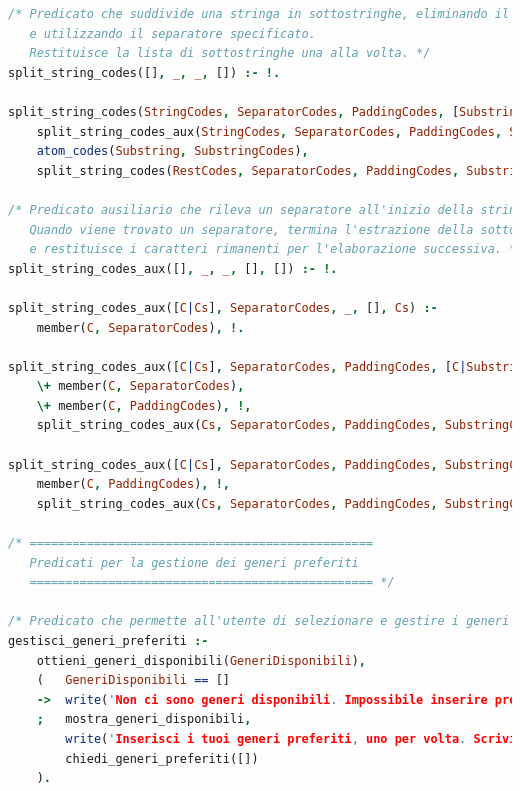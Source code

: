 \documentclass[a4paper,11pt]{article}
\begin{document}
\begin{lstlisting}[language=Prolog]
/* Predicato che suddivide una stringa in sottostringhe, eliminando il padding
   e utilizzando il separatore specificato.
   Restituisce la lista di sottostringhe una alla volta. */
split_string_codes([], _, _, []) :- !.

split_string_codes(StringCodes, SeparatorCodes, PaddingCodes, [Substring|Substrings]) :-
    split_string_codes_aux(StringCodes, SeparatorCodes, PaddingCodes, SubstringCodes, RestCodes),
    atom_codes(Substring, SubstringCodes),
    split_string_codes(RestCodes, SeparatorCodes, PaddingCodes, Substrings).

/* Predicato ausiliario che rileva un separatore all'inizio della stringa.
   Quando viene trovato un separatore, termina l'estrazione della sottostringa corrente
   e restituisce i caratteri rimanenti per l'elaborazione successiva. */
split_string_codes_aux([], _, _, [], []) :- !.

split_string_codes_aux([C|Cs], SeparatorCodes, _, [], Cs) :-
    member(C, SeparatorCodes), !.

split_string_codes_aux([C|Cs], SeparatorCodes, PaddingCodes, [C|SubstringCodes], RestCodes) :-
    \+ member(C, SeparatorCodes),
    \+ member(C, PaddingCodes), !,
    split_string_codes_aux(Cs, SeparatorCodes, PaddingCodes, SubstringCodes, RestCodes).

split_string_codes_aux([C|Cs], SeparatorCodes, PaddingCodes, SubstringCodes, RestCodes) :-
    member(C, PaddingCodes), !,
    split_string_codes_aux(Cs, SeparatorCodes, PaddingCodes, SubstringCodes, RestCodes).

/* ================================================
   Predicati per la gestione dei generi preferiti
   ================================================ */

/* Predicato che permette all'utente di selezionare e gestire i generi musicali preferiti. */
gestisci_generi_preferiti :- 
    ottieni_generi_disponibili(GeneriDisponibili),
    (   GeneriDisponibili == []
    ->  write('Non ci sono generi disponibili. Impossibile inserire preferenze.\n')
    ;   mostra_generi_disponibili,
        write('Inserisci i tuoi generi preferiti, uno per volta. Scrivi "fine" per terminare.\n'),
        chiedi_generi_preferiti([])
    ).


\end{lstlisting}
\end{document}
